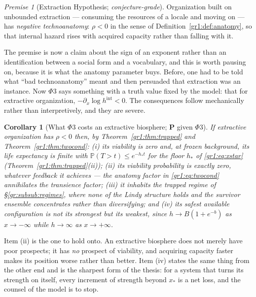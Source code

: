 \documentclass[11pt]{article}
\numberwithin{equation}{section}
\theoremstyle{plain}
\newtheorem{corollary}[theorem]{Corollary}
\theoremstyle{definition}
\theoremstyle{remark}
\newcommand{\PP}{\mathbb{P}}
\newtheorem{premise}{Premise}
\begin{document}
\setcounter{premise}{2} %
\begin{premise}[Extraction Hypothesis; \emph{conjecture-grade}]
\label{gr:phi3}
Organization built on unbounded extraction --- consuming the resources
of a locale and moving on --- has \emph{negative technoanatomy}:
$\rho<0$ in the sense of Definition~\ref{gr1:def:anatomy}, so that
internal hazard rises with acquired capacity rather than falling with
it.
\end{premise}

The premise is now a claim about the sign of an exponent rather than an
identification between a social form and a vocabulary, and this is worth
pausing on, because it is what the anatomy parameter buys. Before, one
had to be told what ``bad technoanatomy'' meant and then persuaded that
extraction was an instance. Now $\Phi3$ says something with a truth
value fixed by the model: that for extractive organization,
$-\partial_x\log h^{\mathrm{int}}<0$. The consequences follow
mechanically rather than interpretively, and they are severe.

\begin{corollary}[What $\Phi3$ costs an extractive biosphere; \textbf{P}
given $\Phi3$]\label{gr:cor:extractcost}
If extractive organization has $\rho<0$ then, by
Theorem~\ref{gr1:thm:trapped} and Theorem~\ref{gr1:thm:twocond}:
\emph{(i)} its viability is zero and, at frozen background, its life
expectancy is finite with $\PP(T>t)\le e^{-h_\ast t}$ for the floor
$h_\ast$ of \eqref{gr1:eq:xstar} (Theorem~\ref{gr1:thm:trapped}(ii));
\emph{(ii)} its viability probability is \emph{exactly zero}, whatever
feedback it achieves --- the anatomy factor in \eqref{gr1:eq:twocond}
annihilates the transience factor;
\emph{(iii)} it inhabits the trapped regime of
\S\ref{gr:subsub:regimes}, where none of the Lindy structure holds and
the survivor ensemble concentrates rather than diversifying;
and \emph{(iv)} its safest available configuration is not its strongest
but its \emph{weakest}, since $h\to B(1+e^{-b})$ as $x\to-\infty$ while
$h\to\infty$ as $x\to+\infty$.
\end{corollary}

\noindent Item (ii) is the one to hold onto. An extractive biosphere
does not merely have poor prospects; it has \emph{no} prospect of
viability, and acquiring capacity faster makes its position worse rather
than better. Item (iv) states the same thing from the other end and is
the sharpest form of the thesis: for a system that turns its strength on
itself, every increment of strength beyond $x_\ast$ is a net loss, and
the counsel of the model is to stop.
\end{document}
